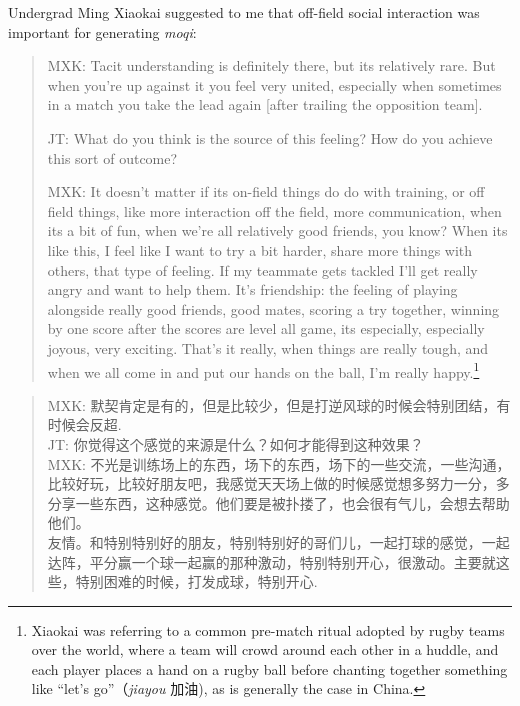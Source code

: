 \begin{CJK}{UTF8}{gbsn}
Undergrad Ming Xiaokai suggested to me that off-field social interaction was important for generating \textit{moqi}:

    \begin{quote}
        MXK: Tacit understanding is definitely there, but its relatively rare. But when you're up against it you feel very united, especially when sometimes in a match you take the lead again [after trailing the opposition team].

        JT: What do you think is the source of this feeling?  How do you achieve this sort of outcome?

        MXK: It doesn't matter if its on-field things do do with training, or off field things, like more interaction off the field, more communication, when its a bit of fun, when we're all relatively good friends, you know?  When its like this, I feel like I want to try a bit harder, share more things with others, that type of feeling.  If my teammate gets tackled I'll get really angry and want to help them.  It's friendship: the feeling of playing alongside really good friends, good mates, scoring a try together, winning by one score after the scores are level all game, its especially, especially joyous, very exciting.  That's it really, when things are really tough, and when we all come in and put our hands on the ball, I'm really happy.\footnote{Xiaokai was referring to a common pre-match ritual adopted by rugby teams over the world, where a team will crowd around each other in a huddle, and each player places a hand on a rugby ball before chanting together something like ``let's go''（\textit{jiayou} 加油), as is generally the case in China.}
    \end{quote}

    \begin{quote}
        MXK: 默契肯定是有的，但是比较少，但是打逆风球的时候会特别团结，有时候会反超. \\
        JT: 你觉得这个感觉的来源是什么？如何才能得到这种效果？\\
        MXK: 不光是训练场上的东西，场下的东西，场下的一些交流，一些沟通，比较好玩，比较好朋友吧，我感觉天天场上做的时候感觉想多努力一分，多分享一些东西，这种感觉。他们要是被扑搂了，也会很有气儿，会想去帮助他们。 \\

友情。和特别特别好的朋友，特别特别好的哥们儿，一起打球的感觉，一起达阵，平分赢一个球一起赢的那种激动，特别特别开心，很激动。主要就这些，特别困难的时候，打发成球，特别开心.
    \end{quote}


\end{CJK}
